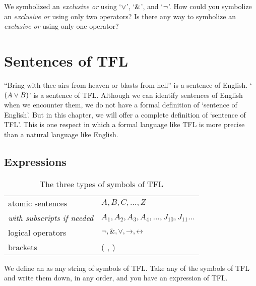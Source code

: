 \problempart
We symbolized an \emph{exclusive or} using `$\vee$', `$\mathbin{\&}$', and `${\neg}$'. How could you symbolize an \emph{exclusive or} using only two operators? Is there any way to symbolize an \emph{exclusive or} using only one operator?



\chapter{Sentences of TFL}\label{s:TFLSentences}

``Bring with thee airs from heaven or blasts from hell'' is a sentence of English. `$(A \vee B)$' is a sentence of TFL. Although we can identify sentences of English when we encounter them, we do not have a formal definition of `sentence of English'. But in this chapter, we will offer a complete definition of `sentence of TFL'. This is one respect in which a formal language like TFL is more precise than a natural language like English.


\section{Expressions}

\begin{table*}\centering\sffamily\footnotesize
{}
\begin{tabular}{@{}l l@{}}\toprule
atomic sentences & $A,B,C,\ldots,Z$\\
\enspace \textit{with subscripts if needed} & $A_1, A_2, A_3,A_4, \ldots, J_{10}, J_{11}\ldots$\\
logical operators & ${\neg},\mathbin{\&},\vee,\rightarrow,\leftrightarrow$\\
brackets &( , )\\
\bottomrule
\end{tabular}
\caption{The three types of symbols of TFL}\label{table.symbols-TFL}
\end{table*}

We define an  as any string of symbols of TFL. Take any of the symbols of TFL and write them down, in any order, and you have an expression of TFL.


